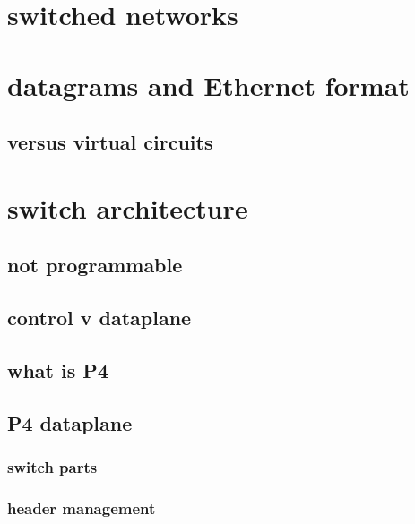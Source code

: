 
\section{switched networks}



\section{datagrams and Ethernet format}




\subsection{versus virtual circuits}



\section{switch architecture}

\subsection{not programmable}


\subsection{control v dataplane}


\subsection{what is P4}

\subsection{P4 dataplane}
\subsubsection{switch parts}

\subsubsection{header management}

